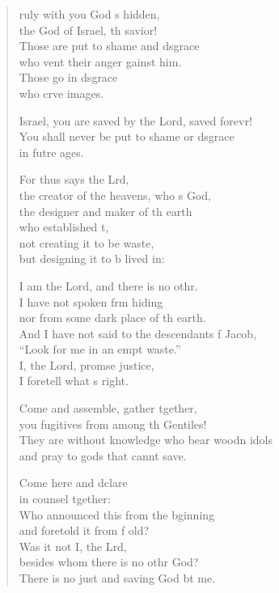 \settowidth{\versewidth}{In the Lord shall be the vindication and the glory *}
\begin{verse}%
  \begin{patverse}
    ruly with you God \pointup{\i}s hidden,\Med\\
the God of Israel, th savior!\\
Those are put to shame and d\pointup{\i}sgrace\Med\\
who vent their anger gainst him.\\
Those go in d\pointup{\i}sgrace\Med\\
who crve images.

Israel, you are saved by the Lord, saved forevr!\Flex\\
You shall never be put to shame or d\pointup{\i}sgrace\Med\\
in futre ages.

For thus says the Lrd,\Flex\\
the creator of the heavens, who \pointup{\i}s God,\Med\\
the designer and maker of th earth\\
who established \pointup{\i}t,\Flex\\
not creating it to be  waste,\Med\\
but designing it to b lived in:

I am the Lord, and there is no othr.\Flex\\
I have not spoken frm hiding\Med\\
nor from some dark place of th earth.\\
And I have not said to the descendants f Jacob,\Med\\
“Look for me in an empt waste.”\\
I, the Lord, prom\pointup{\i}se justice,\Med\\
I foretell what \pointup{\i}s right.

Come and assemble, gather tgether,\Med\\
you fugitives from among th Gentiles!\\
They are without knowledge who bear woodn idols\Med\\
and pray to gods that cannt save.

Come here and dclare\Med\\
in counsel tgether:\\
Who announced this from the bginning\Med\\
and foretold it from f old?\\
Was it not I, the Lrd,\Flex\\
besides whom there is no othr God?\Med\\
There is no just and saving God bt me.


\end{patverse}
\end{verse}
